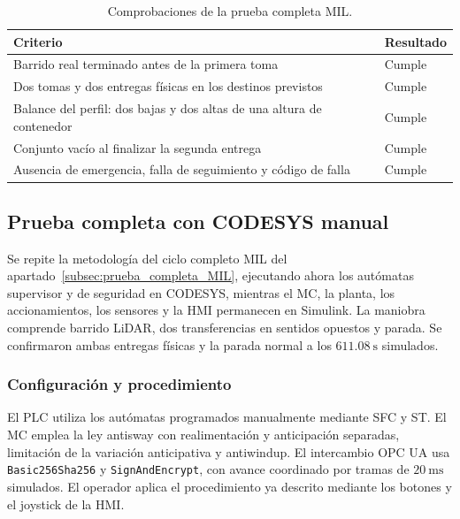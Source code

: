 \documentclass[a4paper,10pt,onecolumn,journal]{ieeeconf}
\numberwithin{equation}{section}
\begin{document}
\begin{table}[!htb]\centering

\caption{Comprobaciones de la prueba completa MIL.}\label{tab:criterios_completa_MIL}

\begin{tabular}{L{10.8cm} C{2.6cm}}\toprule Criterio & Resultado\\\midrule

Barrido real terminado antes de la primera toma & Cumple\\

Dos tomas y dos entregas físicas en los destinos previstos & Cumple\\

Balance del perfil: dos bajas y dos altas de una altura de contenedor & Cumple\\

Conjunto vacío al finalizar la segunda entrega & Cumple\\

Ausencia de emergencia, falla de seguimiento y código de falla & Cumple\\

\bottomrule\end{tabular}\end{table}









\par




\par
{}
\subsection{Prueba completa con CODESYS manual}
\label{subsec:prueba_completa_codesys}
\label{subsec:prueba_integral_pendiente}
Se repite la metodología del ciclo completo MIL del apartado~\ref{subsec:prueba_completa_MIL}, ejecutando ahora los autómatas supervisor y de seguridad en CODESYS, mientras el MC, la planta, los accionamientos, los sensores y la HMI permanecen en Simulink. La maniobra comprende barrido LiDAR, dos transferencias en sentidos opuestos y parada. Se confirmaron ambas entregas físicas y la parada normal a los $611.08~\mathrm{s}$ simulados.


\subsubsection{Configuración y procedimiento}
El PLC utiliza los autómatas programados manualmente mediante SFC y ST. El MC emplea la ley antisway con realimentación y anticipación separadas, limitación de la variación anticipativa y antiwindup. El intercambio OPC UA usa \texttt{Basic256Sha256} y \texttt{SignAndEncrypt}, con avance coordinado por tramas de $20~\mathrm{ms}$ simulados. El operador aplica el procedimiento ya descrito mediante los botones y el joystick de la HMI.
\end{document}
